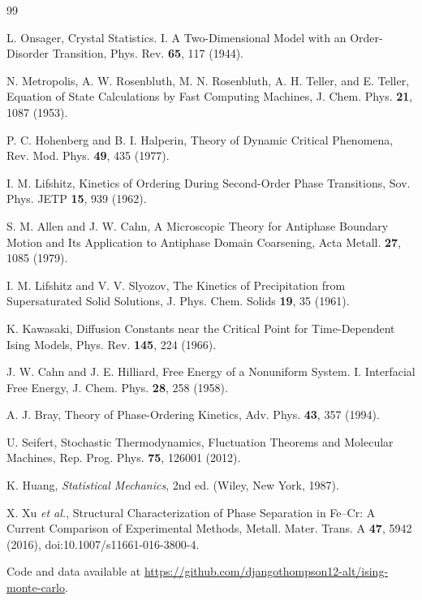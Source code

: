 \documentclass[11pt]{article}
\begin{document}
\begin{thebibliography}{99}

 L. Onsager, Crystal Statistics. I. A Two-Dimensional Model with an Order-Disorder Transition, Phys. Rev. \textbf{65}, 117 (1944).

 N. Metropolis, A. W. Rosenbluth, M. N. Rosenbluth, A. H. Teller, and E. Teller, Equation of State Calculations by Fast Computing Machines, J. Chem. Phys. \textbf{21}, 1087 (1953).

 P. C. Hohenberg and B. I. Halperin, Theory of Dynamic Critical Phenomena, Rev. Mod. Phys. \textbf{49}, 435 (1977).

 I. M. Lifshitz, Kinetics of Ordering During Second-Order Phase Transitions, Sov. Phys. JETP \textbf{15}, 939 (1962).

 S. M. Allen and J. W. Cahn, A Microscopic Theory for Antiphase Boundary Motion and Its Application to Antiphase Domain Coarsening, Acta Metall. \textbf{27}, 1085 (1979).

 I. M. Lifshitz and V. V. Slyozov, The Kinetics of Precipitation from Supersaturated Solid Solutions, J. Phys. Chem. Solids \textbf{19}, 35 (1961).

 K. Kawasaki, Diffusion Constants near the Critical Point for Time-Dependent Ising Models, Phys. Rev. \textbf{145}, 224 (1966).

 J. W. Cahn and J. E. Hilliard, Free Energy of a Nonuniform System. I. Interfacial Free Energy, J. Chem. Phys. \textbf{28}, 258 (1958).

 A. J. Bray, Theory of Phase-Ordering Kinetics, Adv. Phys. \textbf{43}, 357 (1994).

 U. Seifert, Stochastic Thermodynamics, Fluctuation Theorems and Molecular Machines, Rep. Prog. Phys. \textbf{75}, 126001 (2012).

 K. Huang, \textit{Statistical Mechanics}, 2nd ed. (Wiley, New York, 1987).

 X. Xu \emph{et al.}, Structural Characterization of Phase Separation in Fe--Cr: A Current Comparison of Experimental Methods, Metall. Mater. Trans. A \textbf{47}, 5942 (2016), doi:10.1007/s11661-016-3800-4.

 Code and data available at \url{https://github.com/djangothompson12-alt/ising-monte-carlo}.

\end{thebibliography}
\end{document}
